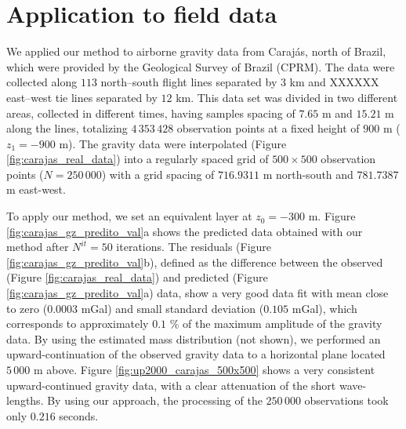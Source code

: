 \section{Application to field data}

We applied our method to airborne gravity data from Caraj{\'a}s, north of Brazil, which were provided by 
the Geological Survey of Brazil (CPRM). The data were collected along $113$ north–south flight lines separated 
by $3$ km and XXXXXX east–west tie lines separated by $12$ km.
This data set was divided in two different areas, collected in different times, having samples spacing of 
$7.65$ m and $15.21$ m along the lines, totalizing  $4\,353\,428$ observation points at a fixed height 
of $900$ m ($z_{1} = -900$ m). 
The gravity data were interpolated (Figure \ref{fig:carajas_real_data}) into a regularly spaced grid of 
$500 \times 500$ observation points ($N = 250\,000$) with a grid spacing of $716.9311$ m north-south and 
$781.7387$ m east-west.

To apply our method, we set an equivalent layer at $z_{0} = -300$ m. 
Figure \ref{fig:carajas_gz_predito_val}a shows the predicted data obtained with our method after 
$N^{it} = 50$ iterations.
The residuals (Figure \ref{fig:carajas_gz_predito_val}b), defined as the difference between the observed 
(Figure \ref{fig:carajas_real_data}) and predicted (Figure \ref{fig:carajas_gz_predito_val}a) data, show a 
very good data fit with mean close to zero ($0.0003$ mGal) and small standard deviation ($0.105$ mGal), 
which corresponds to approximately $0.1$ \% of the maximum amplitude of the gravity data.
By using the estimated mass distribution (not shown), we performed an upward-continuation of the 
observed gravity data to a horizontal plane located $5\,000$ m above. Figure \ref{fig:up2000_carajas_500x500} 
shows a very consistent upward-continued gravity data, with a clear attenuation of the short 
wave-lengths. By using our approach, the processing of the $250\,000$ observations took only 
$0.216$ seconds.